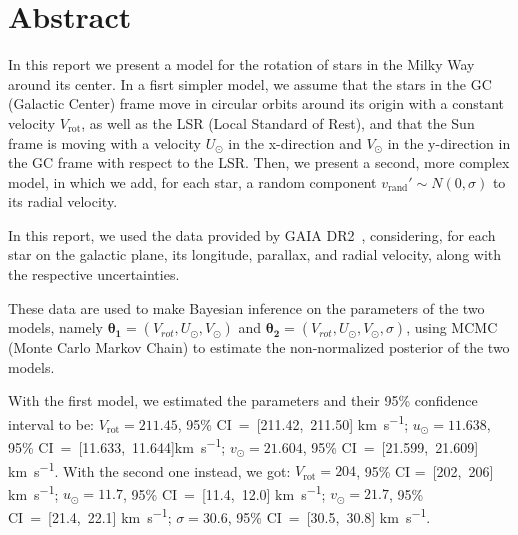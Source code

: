\section*{Abstract}

In this report we present a model for the rotation of stars in the Milky Way around its center.
In a fisrt simpler model, we assume that the stars in the GC (Galactic Center) frame move in circular orbits around its origin with a constant velocity $V_{\text{rot}}$, as well as the LSR (Local Standard of Rest), and that the Sun frame is moving with a velocity $U_{\odot}$ in the x-direction and $V_{\odot}$ in the y-direction in the GC frame with respect to the LSR. Then, we present a second, more complex model, in which we add, for each star, a random component $v_{\text{rand}}' \sim N(0, \sigma)$ to its radial velocity.



In this report, we used the data provided by GAIA DR2~\cite{GAIADR2}, considering, for each star on the galactic plane, its longitude, parallax, and radial velocity, along with the respective uncertainties.

These data are used to make Bayesian inference on the parameters of the two models, namely $\mathbf{\theta_1} = (V_{rot}, U_{\odot}, V_{\odot})$ and $\mathbf{\theta_2} = (V_{rot}, U_{\odot}, V_{\odot}, \sigma)$, using MCMC (Monte Carlo Markov Chain) to estimate the non-normalized posterior of the two models. 

With the first model, we estimated the parameters and their 95\% confidence interval to be: $V_{\text{rot}} = 211.45$, 95\% CI~=~[211.42,~211.50] \unit{\kilo\meter\per\second}; $u_{\odot} = 11.638$, 95\% CI~=~[11.633,~11.644]\unit{\kilo\meter\per\second}; $v_{\odot} = 21.604$, 95\% CI~=~[21.599,~21.609] \unit{\kilo\meter\per\second}. With the second one instead, we got: $V_{\text{rot}}= 204$, 95\% CI =~[202,~206] \unit{\kilo\meter\per\second}; $u_{\odot} = 11.7$, 95\% CI~=~[11.4,~12.0] \unit{\kilo\meter\per\second}; $v_{\odot} = 21.7$, 95\% CI~=~[21.4,~22.1] \unit{\kilo\meter\per\second}; $\sigma = 30.6$, 95\% CI~=~[30.5,~30.8] \unit{\kilo\meter\per\second}. 

